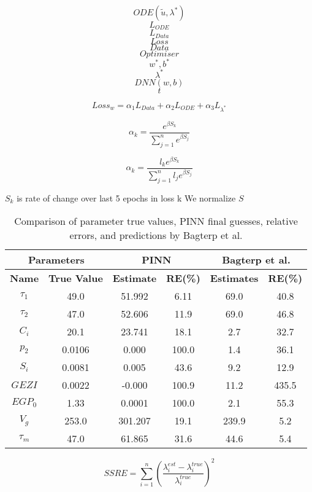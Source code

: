 \documentclass[11pt]{memoir}
\begin{document}
	$$ODE\left(\tilde{u}, \lambda^*\right) $$
	\[ L_{ODE} \]
	\[ L_{Data} \]
	\[ Loss \]
	\[ Data \]
	\[ Optimiser \]
	\[ w^*, b^* \]
	\[ \lambda^* \]
	\[ DNN(w,b) \]
	\[ t \]
	
	 \[Loss_{w} =  \alpha_1 L_{Data} +\alpha_2L_{ODE} + \alpha_3L_{\lambda^*} \]
	 
	 \[\alpha_k = \frac{e^{\beta S_k}}{\sum_{j=1}^n e ^{\beta S_j} }\]
	 
	 \[\alpha_k = \frac{l_k e^{\beta S_k}}{\sum_{j=1}^n l_j e ^{\beta S_j} }\]
	 
	 $S_k$ is rate of change over last 5 epochs in loss k
	 We normalize $S$
	 
	 
	 \begin{table}[h!]
	 	\centering
	 	\begin{tabular}{|c|c|c|c|c|c|}
	 		\hline
	 		\multicolumn{2}{|c|}{\textbf{Parameters}} & \multicolumn{2}{c|}{\textbf{PINN}} & \multicolumn{2}{c|}{\textbf{Bagterp et al.}} \\ \hline
	 		\textbf{Name} & \textbf{True Value} & \textbf{Estimate} & \textbf{RE(\%)} & \textbf{Estimates} & \textbf{RE(\%)} \\ \hline
	 		$\tau_1$    &  49.0  &  51.992  &  6.11   & 69.0     & 40.8     \\ \hline
	 		$\tau_2$    &  47.0  &  52.606  &  11.9   & 69.0     & 46.8     \\ \hline
	 		$C_i$   	&  20.1  &  23.741  &   18.1  & 2.7      & 32.7     \\ \hline
	 		$p_2$      &  0.0106   &  0.000   &  100.0   & 1.4      & 36.1     \\ \hline
	 		$S_i$      &  0.0081   &  0.005   &  43.6   & 9.2      & 12.9     \\ \hline
	 		$GEZI$    & 0.0022    & -0.000   & 100.9    & 11.2     & 435.5    \\ \hline
	 		$EGP_0$    & 1.33    & 0.0001    & 100.0    & 2.1      & 55.3     \\ \hline
	 		$V_g$      & 253.0  & 301.207  & 19.1    & 239.9    & 5.2      \\ \hline
	 		$\tau_m$    & 47.0   & 61.865   & 31.6    & 44.6     & 5.4      \\ \hline
	 	\end{tabular}
	 	\caption{Comparison of parameter true values, PINN final guesses, relative errors, and predictions by Bagterp et al.}
	 	\label{tab:parameter_comparison}
	 \end{table}
	 
	 \[ SSRE = \sum_{i=1}^{n}\left(\frac{\lambda^{est}_i - \lambda_i^{true} }{\lambda_i^{true}}\right)^2 \]
\end{document}
